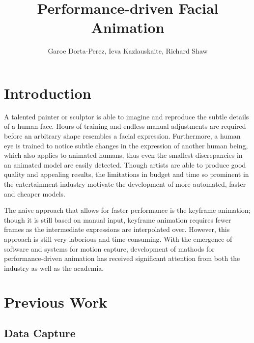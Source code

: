 \documentclass[11pt]{report}
\title{Performance-driven Facial Animation} \author{Garoe Dorta-Perez, Ieva Kazlauskaite, Richard Shaw}
\begin{document}
\maketitle

\chapter{Introduction}
\label{ch:intro}
\begin{center}
\end{center}

A talented painter or sculptor is able to imagine and reproduce the subtle details of a human face. Hours of training and endless manual adjustments are required before an arbitrary shape resembles a facial expression. Furthermore, a human eye is trained to notice subtle changes in the expression of another human being, which also applies to animated humans, thus even the smallest discrepancies in an animated model are easily detected. Though artists are able to produce good quality and appealing results, the limitations in budget and time so prominent in the entertainment industry motivate the development of more automated, faster and cheaper models.

The naive approach that allows for faster performance is the keyframe animation; though it is still based on manual input, keyframe animation requires fewer frames as the intermediate expressions are interpolated over. However, this approach is still very laborious and time consuming. With the emergence of software and systems for motion capture, development of mathods for performance-driven animation has received significant attention from both the industry as well as the academia.



\chapter{Previous Work}
\label{sec:previous}

\section{Data Capture}
\end{document}
